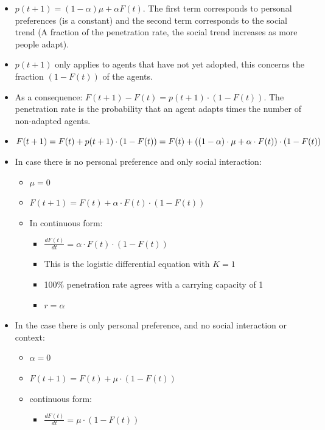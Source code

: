 \begin{itemize}
    \item $p(t+1) = (1 - \alpha) \mu + \alpha F(t)$. The first term corresponds
        to personal preferences (is a constant) and the second term corresponds
        to the social trend (A fraction of the penetration rate, the social
        trend increases as more people adapt).
    \item $p(t+1)$ only applies to agents that have not yet adopted, this
        concerns the fraction $(1-F(t))$ of the agents.
    \item As a consequence: $F(t+1) - F(t) = p(t+1) \cdot (1-F(t))$.
        The penetration rate is the probability that an agent adapts times
        the number of non-adapted agents.
    \item $F(t+1) = F(t) + p(t+1) \cdot (1-F(t)) = F(t) +
        \left( (1-\alpha) \cdot \mu + \alpha \cdot F(t) \right) \cdot (1-F(t))$
    \item In case there is no personal preference and only social interaction:
        \begin{itemize}
            \item $\mu = 0$
            \item $F(t+1) = F(t) + \alpha \cdot F(t) \cdot (1 - F(t))$
            \item In continuous form:
            \begin{itemize}
                \item $\frac{dF(t)}{dt} = \alpha \cdot F(t) \cdot (1 - F(t))$
                \item This is the logistic differential equation with $K=1$
                \item 100\% penetration rate agrees with a carrying capacity of 1
                \item $r = \alpha$
            \end{itemize}
        \end{itemize}
    \item In the case there is only personal preference, and no social
        interaction or context:
        \begin{itemize}
            \item $\alpha = 0$
            \item $F(t+1) = F(t) + \mu \cdot (1 - F(t))$
            \item continuous form:
            \begin{itemize}
                \item $\frac{dF(t)}{dt} = \mu \cdot (1 - F(t))$

\end{itemize}
\end{itemize}
\end{itemize}
